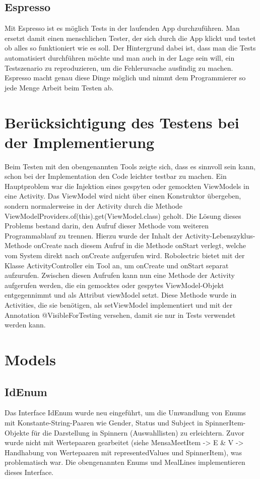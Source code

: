 \documentclass[a4paper]{scrreprt}
\begin{document}
\subsection{Espresso}
Mit Espresso ist es möglich Tests in der laufenden App durchzuführen. Man ersetzt damit einen menschlichen Tester, der sich durch die App klickt und testet ob alles so funktioniert wie es soll. Der Hintergrund dabei ist, dass man die Tests automatisiert durchführen möchte und man auch in der Lage sein will, ein Testszenario zu reproduzieren, um die Fehlerursache ausfindig zu machen. Espresso macht genau diese Dinge möglich und nimmt dem Programmierer so jede Menge Arbeit beim Testen ab.


\section{Berücksichtigung des Testens bei der Implementierung}
Beim Testen mit den obengenannten Tools zeigte sich, dass es sinnvoll sein kann, schon bei der Implementation den Code leichter testbar zu machen. Ein Hauptproblem war die Injektion eines gespyten oder gemockten ViewModels in eine Activity. Das ViewModel wird nicht über einen Konstruktor übergeben, sondern normalerweise in der Activity durch die Methode ViewModelProviders.of(this).get(ViewModel.class) geholt. Die Lösung dieses Problems bestand darin, den Aufruf dieser Methode vom weiteren Programmablauf zu trennen. Hierzu wurde der Inhalt der Activity-Lebenszyklus-Methode onCreate nach diesem Aufruf in die Methode onStart verlegt, welche vom System direkt nach onCreate aufgerufen wird. Robolectric bietet mit der Klasse ActivityController ein Tool an, um onCreate und onStart separat aufzurufen. Zwischen diesen Aufrufen kann nun eine Methode der Activity aufgerufen werden, die ein gemocktes oder gespytes ViewModel-Objekt entgegennimmt und als Attribut viewModel setzt. Diese Methode wurde in Activities, die sie benötigen, als setViewModel implementiert und mit der Annotation @VisibleForTesting versehen, damit sie nur in Tests verwendet werden kann.



\section{Models}
\subsection{IdEnum}
Das Interface IdEnum wurde neu eingeführt, um die Umwandlung von Enums mit Konstante-String-Paaren wie Gender, Status und Subject in SpinnerItem-Objekte für die Darstellung in Spinnern (Auswahllisten) zu erleichtern. Zuvor wurde nicht mit Wertepaaren gearbeitet (siehe MensaMeetItem -> E \& V -> Handhabung von Wertepaaren mit representedValues und SpinnerItem), was problematisch war. Die obengenannten Enums und MealLines implementieren dieses Interface.
\end{document}
